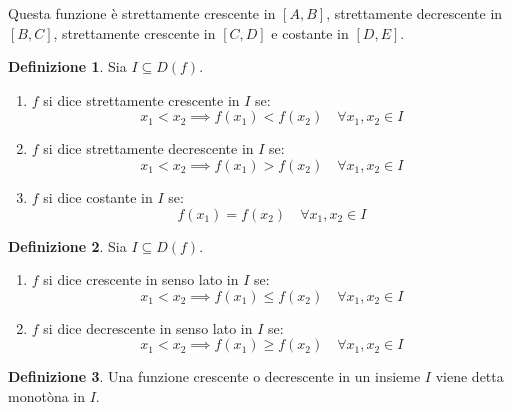 \documentclass[a4paper]{article}
\theoremstyle{plain}
\theoremstyle{definition}
\newtheorem{definizione}{Definizione}
\theoremstyle{remark}
\begin{document}
Questa funzione è strettamente crescente in $[A,B]$, strettamente decrescente in $[B,C]$, strettamente crescente in $[C,D]$ e costante in $[D,E]$.
\begin{definizione}
    Sia $I\subseteq D(f)$.
    \begin{enumerate}
        \item $f$ si dice strettamente crescente in $I$ se:
        \begin{equation}
            x_1<x_2\implies f(x_1)<f(x_2)\quad \forall x_1,x_2\in I
        \end{equation}
        \item $f$ si dice strettamente decrescente in $I$ se:
        \begin{equation}
            x_1<x_2\implies f(x_1)>f(x_2)\quad \forall x_1,x_2\in I
        \end{equation}
        \item $f$ si dice costante in $I$ se:
        \begin{equation}
            f(x_1)=f(x_2)\quad \forall x_1,x_2\in I
        \end{equation}
    \end{enumerate}
\end{definizione}
\begin{definizione}
    Sia $I\subseteq D(f)$.
    \begin{enumerate}
        \item $f$ si dice crescente in senso lato in $I$ se:
        \begin{equation}
            x_1<x_2\implies f(x_1)\leq f(x_2)\quad \forall x_1,x_2\in I
        \end{equation}
        \item $f$ si dice decrescente in senso lato in $I$ se:
        \begin{equation}
            x_1<x_2\implies f(x_1)\geq f(x_2)\quad \forall x_1,x_2\in I
        \end{equation}
    \end{enumerate}
\end{definizione}
\begin{definizione}
    Una funzione crescente o decrescente in un insieme $I$ viene detta monotòna in $I$.
\end{definizione}
\newpage
\end{document}

